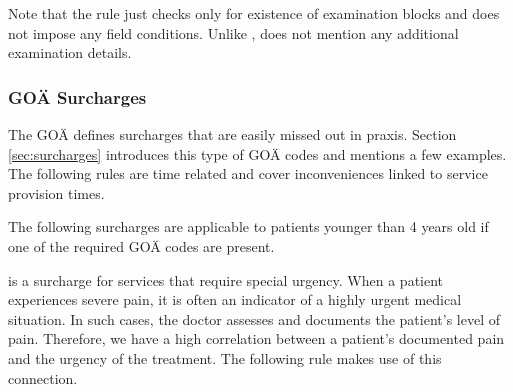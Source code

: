 Note that the rule just checks only for existence of examination blocks and does not impose any field conditions.
Unlike ,  does not mention any additional examination details.

\subsubsection{GOÄ Surcharges}

The GOÄ defines surcharges that are easily missed out in praxis.
Section \ref{sec:surcharges} introduces this type of GOÄ codes and mentions a few examples.
The following rules are time related and cover inconveniences linked to service provision times.









The following surcharges are applicable to patients younger than 4 years old if one of the required GOÄ codes are present.






 is a surcharge for services that require special urgency.
When a patient experiences severe pain, it is often an indicator of a highly urgent medical situation.
In such cases, the doctor assesses and documents the patient's level of pain.
Therefore, we have a high correlation between a patient's documented pain and the urgency of the treatment.
The following rule makes use of this connection.



